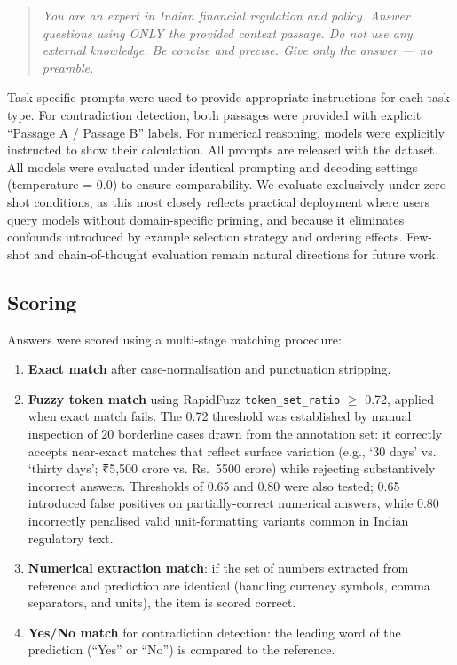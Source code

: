 \documentclass[11pt]{article}
\begin{document}
\begin{quote}
\textit{You are an expert in Indian financial regulation and policy. Answer
questions using ONLY the provided context passage. Do not use any external
knowledge. Be concise and precise. Give only the answer --- no preamble.}
\end{quote}

Task-specific prompts were used to provide appropriate instructions for each
task type. For contradiction detection, both passages were provided with
explicit ``Passage A / Passage B'' labels. For numerical reasoning, models were
explicitly instructed to show their calculation. All prompts are released with
the dataset. All models were evaluated under identical prompting and decoding
settings (temperature = 0.0) to ensure comparability. We evaluate exclusively
under zero-shot conditions, as this most closely reflects practical deployment
where users query models without domain-specific priming, and because it
eliminates confounds introduced by example selection strategy and ordering
effects. Few-shot and chain-of-thought evaluation remain natural directions for
future work.

\subsection{Scoring}

Answers were scored using a multi-stage matching procedure:

\begin{enumerate}
  \item \textbf{Exact match} after case-normalisation and punctuation stripping.
  \item \textbf{Fuzzy token match} using RapidFuzz \texttt{token\_set\_ratio}
    $\geq$ 0.72, applied when exact match fails. The 0.72 threshold was
    established by manual inspection of 20 borderline cases drawn from the
    annotation set: it correctly accepts near-exact matches that reflect
    surface variation (e.g., `30 days' vs. `thirty days'; \textrm{₹}5{,}500
    crore vs. Rs.\ 5500 crore) while rejecting substantively incorrect answers.
    Thresholds of 0.65 and 0.80 were also tested; 0.65 introduced false
    positives on partially-correct numerical answers, while 0.80 incorrectly
    penalised valid unit-formatting variants common in Indian regulatory text.
  \item \textbf{Numerical extraction match}: if the set of numbers extracted
    from reference and prediction are identical (handling currency symbols,
    comma separators, and units), the item is scored correct.
  \item \textbf{Yes/No match} for contradiction detection: the leading word of
    the prediction (``Yes'' or ``No'') is compared to the reference.
\end{enumerate}
\end{document}
